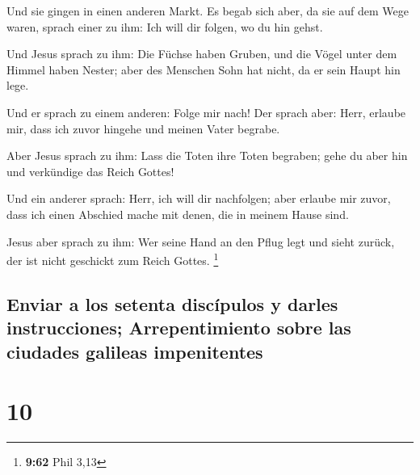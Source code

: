  Und sie gingen in einen anderen Markt. Es begab sich
aber, da sie auf dem Wege waren, sprach einer zu ihm: Ich will dir
folgen, wo du hin gehst.

 Und Jesus sprach zu ihm: Die Füchse haben Gruben, und
die Vögel unter dem Himmel haben Nester; aber des Menschen Sohn hat
nicht, da er sein Haupt hin lege.

 Und er sprach zu einem anderen: Folge mir nach! Der
sprach aber: Herr, erlaube mir, dass ich zuvor hingehe und meinen Vater
begrabe.

 Aber Jesus sprach zu ihm: Lass die Toten ihre Toten
begraben; gehe du aber hin und verkündige das Reich Gottes!

 Und ein anderer sprach: Herr, ich will dir nachfolgen;
aber erlaube mir zuvor, dass ich einen Abschied mache mit denen, die in
meinem Hause sind.

 Jesus aber sprach zu ihm: Wer seine Hand an den Pflug
legt und sieht zurück, der ist nicht geschickt zum Reich Gottes.
\footnote{\textbf{9:62} Phil 3,13}

\hypertarget{enviar-a-los-setenta-discuxedpulos-y-darles-instrucciones-arrepentimiento-sobre-las-ciudades-galileas-impenitentes}{%
\subsection{Enviar a los setenta discípulos y darles instrucciones;
Arrepentimiento sobre las ciudades galileas
impenitentes}\label{enviar-a-los-setenta-discuxedpulos-y-darles-instrucciones-arrepentimiento-sobre-las-ciudades-galileas-impenitentes}}

\hypertarget{section-9}{%
\section{10}\label{section-9}}

